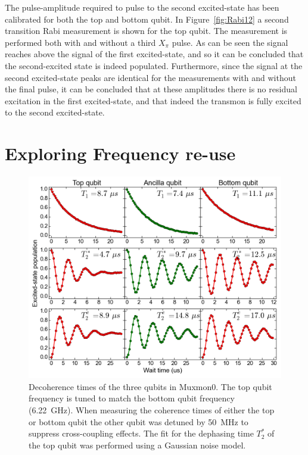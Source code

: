         The pulse-amplitude required to pulse to the second excited-state has been calibrated for both the top and bottom qubit. In Figure~\ref{fig:Rabi12} a second transition Rabi measurement is shown for the top qubit. The measurement is performed both with and without a third $X_\pi$ pulse. As can be seen the signal reaches above the signal of the first excited-state, and so it can be concluded that the second-excited state is indeed populated. Furthermore, since the signal at the second excited-state peaks are identical for the measurements with and without the final pulse, it can be concluded that at these amplitudes there is no residual excitation in the first excited-state, and that indeed the transmon is fully excited to the second excited-state.


    \section{Exploring Frequency re-use}
      \label{sec:Exploring Frequency re-use}
      \begin{figure}[tb]
        \centering
        \includegraphics[width=\linewidth]{../Figures/Exploring frequency re-use/coherence_times.png}
        \caption{Decoherence times of the three qubits in Muxmon0. The top qubit frequency is tuned to match the bottom qubit frequency (\SI{6.22}{\giga \hertz}). When measuring the coherence times of either the top or bottom qubit the other qubit was detuned by \SI{50}{\mega \hertz} to suppress cross-coupling effects. The fit for the dephasing time $T_2^*$ of the top qubit was performed using a Gaussian noise model.}
        \label{fig:decoherence times Muxmon0}
      \end{figure}

